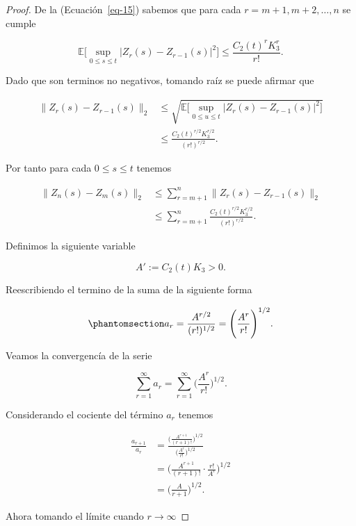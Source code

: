 \documentclass[
  spanish,
  us-letterpaper,
]{scrreprt}
\theoremstyle{plain}
\theoremstyle{plain}
\theoremstyle{definition}
\theoremstyle{plain}
\theoremstyle{remark}
\begin{document}
\begin{proof}
De la (Ecuación~\ref{eq-15}) sabemos que para cada
\(r=m+1,m+2,\ldots,n\) se cumple

\[
    \mathbb{E}\Bigg[\sup\limits_{0\leq s\leq t}|Z_r(s)-Z_{r-1}(s)|^2\Bigg]\leq \frac{C_2(t)^rK_3^r}{r!}.
\]

Dado que son terminos no negativos, tomando raíz se puede afirmar que

\[
    \begin{aligned}
        \|Z_r(s)-Z_{r-1}(s)\|_2 & \leq \sqrt{\mathbb{E}\Bigg[\sup\limits_{0\leq u\leq t}|Z_r(s)-Z_{r-1}(s)|^2\Bigg]}\\ 
        & \leq \frac{C_2(t)^{r/2}K_3^{r/2}}{(r!)^{r/2}}.
    \end{aligned}
\]

Por tanto para cada \(0\leq s\leq t\) tenemos

\[
    \begin{aligned}
        \|Z_n(s)-Z_m(s)\|_2 & \leq \sum\limits_{r=m+1}^n \|Z_r(s)-Z_{r-1}(s)\|_2\\ 
        & \leq \sum\limits_{r=m+1}^n \frac{C_2(t)^{r/2}K_3^{r/2}}{(r!)^{r/2}}.
    \end{aligned}
\]

Definimos la siguiente variable

\[
    A':=C_2(t)K_3>0.
\]

Reescribiendo el termino de la suma de la siguiente forma

\begin{equation}\phantomsection\label{eq-16}{
    a_r=\frac{A^{r/2}}{(r!)^{1/2}}=\Bigg(\frac{A^r}{r!}\Bigg)^{1/2}.
}\end{equation}

Veamos la convergencía de la serie

\[
\sum\limits_{r=1}^{\infty} a_r=\sum\limits_{r=1}^{\infty} \Bigg(\frac{A^r}{r!}\Bigg)^{1/2}.
\]

Considerando el cociente del término \(a_r\) tenemos

\[
    \begin{aligned}
        \frac{a_{r+1}}{a_r} & = \frac{\Bigg(\frac{A^{r+1}}{(r+1)!}\Bigg)^{1/2}}{\Bigg(\frac{A^r}{r!}\Bigg)^{1/2}}\\ 
        & = \Bigg(\frac{A^{r+1}}{(r+1)!}\cdot \frac{r!}{A^r}\Bigg)^{1/2}\\ 
        & = \Bigg(\frac{A}{r+1}\Bigg)^{1/2}.
    \end{aligned}
\]

Ahora tomando el límite cuando \(r\rightarrow\infty\)


\end{proof}
\end{document}
